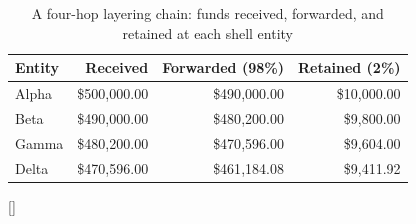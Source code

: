 \documentclass[../ai_in_finance]{subfiles}
\begin{document}
\begin{table}[htbp]
\centering
\begin{lrbox}{\bookmeasuredbox}
\begin{tabular}{lrrr}
\toprule
Entity & Received & Forwarded (98\%) & Retained (2\%) \\
\midrule
Alpha & \$500{,}000.00 & \$490{,}000.00 & \$10{,}000.00 \\
Beta  & \$490{,}000.00 & \$480{,}200.00 & \$9{,}800.00 \\
Gamma & \$480{,}200.00 & \$470{,}596.00 & \$9{,}604.00 \\
Delta & \$470{,}596.00 & \$461{,}184.08 & \$9{,}411.92 \\
\bottomrule
\end{tabular}
\end{lrbox}
\ifdim\wd\bookmeasuredbox<0.65\linewidth
\setlength{\bookcapwidth}{0.65\linewidth}
\else
\setlength{\bookcapwidth}{\wd\bookmeasuredbox}
\fi
{}[\bookcapwidth]{
\usebox{\bookmeasuredbox}
}{
\caption{A four-hop layering chain: funds received, forwarded, and retained at each shell entity}
\label{tab:layering_network}
}
\end{table}
\end{document}
